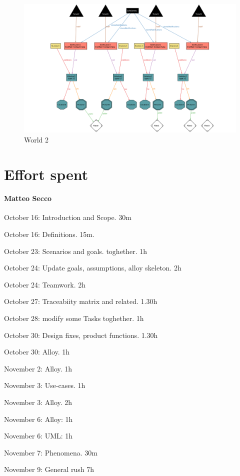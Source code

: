 \documentclass{article}
\begin{document}
	\begin{figure}[H]
		\includegraphics[width=\linewidth]{Images/Alloy_W2_T1}
		\caption{World 2}
		\label{Alloy:W2_T1}
	\end{figure}
	
	
\newpage
\section{Effort spent}

	\paragraph{Matteo Secco} 
		\begin{list}{-}{}
			\item October 16: Introduction and Scope. 30m
			\item October 16: Definitions. 15m.
			\item October 23: Scenarios and goals. toghether. 1h
			\item October 24: Update goals, assumptions, alloy skeleton. 2h
			\item October 24: Teamwork. 2h
			\item October 27: Traceabiity matrix and related. 1.30h
			\item October 28: modify some Tasks toghether. 1h
			\item October 30: Design fixes, product functions. 1.30h
			\item October 30: Alloy. 1h
			\item November 2: Alloy. 1h
			\item November 3: Use-cases. 1h
			\item November 3: Alloy. 2h
			\item November 6: Alloy: 1h
			\item November 6: UML: 1h
			\item November 7: Phenomena. 30m
			\item November 9: General rush 7h
		\end{list}
		
\end{document}
